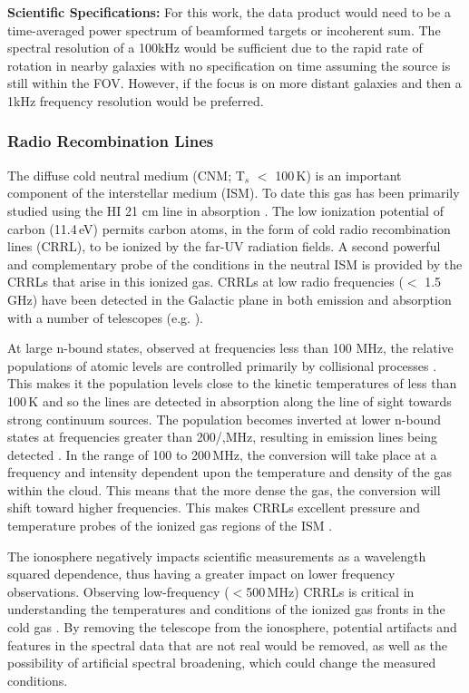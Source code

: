 \textbf{Scientific Specifications:} For this work, the data product would need to be a time-averaged power spectrum of beamformed targets or incoherent sum. The spectral resolution of a 100kHz would be sufficient due to the rapid rate of rotation in nearby galaxies with no specification on time assuming the source is still within the FOV. However, if the focus is on more distant galaxies and then a 1kHz frequency resolution would be preferred. 

\subsubsection{Radio Recombination Lines}
The diffuse cold neutral medium (CNM; T$_{s}$ $<$ 100\,K) is an important component of the interstellar medium (ISM). To date this gas has been primarily studied using the HI 21 cm line in absorption \citep{Dickey_1990}. The low ionization potential of carbon (11.4\,eV) permits carbon atoms, in the form of cold radio recombination lines (CRRL), to be ionized by the far-UV radiation fields. A second powerful and complementary probe of the conditions in the neutral ISM is provided by the CRRLs that arise in this ionized gas. CRRLs at low radio frequencies ($<$ 1.5 GHz) have been detected in the Galactic plane in both emission and absorption with a number of telescopes (e.g. \citealt{Kantharia_2001,Salas_2019,GDIGS}). 

At large n-bound states, observed at frequencies less than 100 MHz, the relative populations of atomic levels are controlled primarily by collisional processes \citep{Tremblay_2018}. This makes it the population levels close to the kinetic temperatures of less than 100\,K and so the lines are detected in absorption along the line of sight towards strong continuum sources. The population becomes inverted at lower n-bound states at frequencies greater than 200/,MHz, resulting in emission lines being detected \citep{Gordon-RRL}. In the range of 100 to 200\,MHz, the conversion will take place at a frequency and intensity dependent upon the temperature and density of the gas within the cloud. This means that the more dense the gas, the conversion will shift toward higher frequencies. This makes CRRLs excellent pressure and temperature probes of the ionized gas regions of the ISM \citep{Salas_2019}.

The ionosphere negatively impacts scientific measurements as a wavelength squared dependence, thus having a greater impact on lower frequency observations. Observing low-frequency ($<$500\,MHz) CRRLs is critical in understanding the temperatures and conditions of the ionized gas fronts in the cold gas \citep{Salas_2018}. By removing the telescope from the ionosphere, potential artifacts and features in the spectral data that are not real would be removed, as well as the possibility of artificial spectral broadening, which could change the measured conditions.

